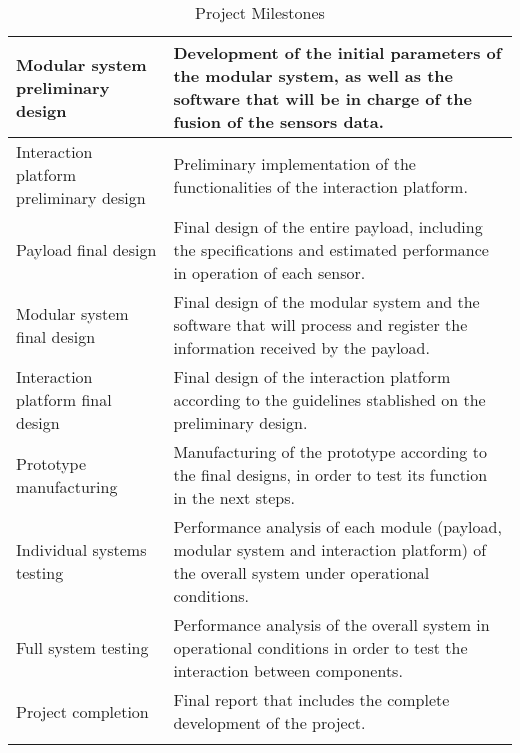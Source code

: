 \begin{longtable}[H]{>{\raggedright\arraybackslash}p{4cm} p{10cm}}
	\midrule
	
	Modular system preliminary design & Development of the initial parameters of the modular system, as well as the software that will be in charge of the fusion of the sensors data.\vspace{0.2cm} \\
	
	\midrule
	
	Interaction platform preliminary design & Preliminary implementation of the functionalities of the interaction platform.\vspace{0.2cm} \\
	
	\midrule
	
	Payload final design & Final design of the entire payload, including the specifications and estimated performance in operation of each sensor.\vspace{0.2cm} \\
	
	\midrule
	
	Modular system final design & Final design of the modular system and the software that will process and register the information received by the payload.\vspace{0.2cm} \\
	
	\midrule
	
	Interaction platform final design & Final design of the interaction platform according to the guidelines stablished on the preliminary design.\vspace{0.2cm} \\
	
	\midrule
	
	Prototype manufacturing & Manufacturing of the prototype according to the final designs, in order to test its function in the next steps.\vspace{0.2cm} \\
	
	\midrule
	
	Individual systems testing & Performance analysis of each module (payload, modular system and interaction platform) of the overall system under operational conditions.\vspace{0.2cm} \\
	
	\midrule
	
	Full system testing & Performance analysis of the overall system in operational conditions in order to test the interaction between components.\vspace{0.2cm} \\
	
	\midrule
	
	Project completion & Final report that includes the complete development of the project.\vspace{0.2cm} \\
	
	\bottomrule[2pt]
	
	\caption{Project Milestones}
	\label{tabla_milestones}
\end{longtable}